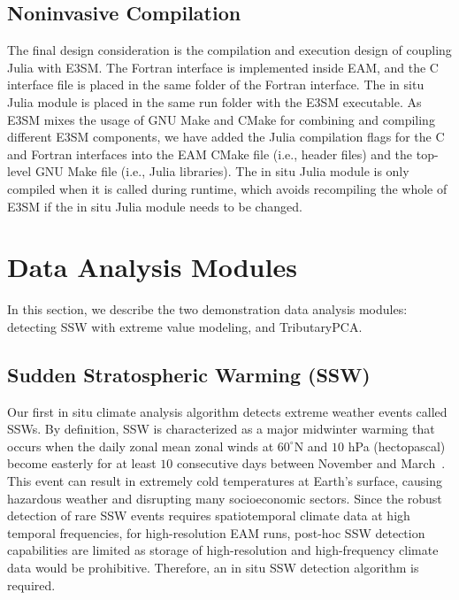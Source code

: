 \documentclass{juliacon}
\begin{document}
\subsection{Noninvasive Compilation}
The final design consideration is the compilation and execution design of coupling Julia with E3SM. The Fortran interface is implemented inside EAM, and the C interface file is placed in the same folder of the Fortran interface. The in situ Julia module is placed in the same run folder with the E3SM executable. As E3SM mixes the usage of GNU Make and CMake for combining and compiling different E3SM components, we have added the Julia compilation flags for the C and Fortran interfaces into the EAM CMake file (i.e., header files) and the top-level GNU Make file (i.e., Julia libraries). The in situ Julia module is only compiled when it is called during runtime, which avoids recompiling the whole of E3SM if the in situ Julia module needs to be changed.





\section{Data Analysis Modules}
In this section, we describe the two demonstration data analysis modules: detecting SSW with extreme value modeling, and TributaryPCA.

\subsection{Sudden Stratospheric Warming (SSW)}
Our first in situ climate analysis algorithm detects extreme weather events called SSWs. By definition, SSW is characterized as a major midwinter warming that occurs when the daily zonal mean zonal winds at $60^{\circ}$N and $10$ hPa (hectopascal) become easterly for at least $10$ consecutive days between November and March~\cite{ssw,ssw_def}. This event can result in extremely cold temperatures at Earth's surface, causing hazardous weather and disrupting many socioeconomic sectors. Since the robust detection of rare SSW events requires spatiotemporal climate data at high temporal frequencies, for high-resolution EAM runs, post-hoc SSW detection capabilities are limited as storage of high-resolution and high-frequency climate data would be prohibitive. Therefore, an in situ SSW detection algorithm is required.
\end{document}

